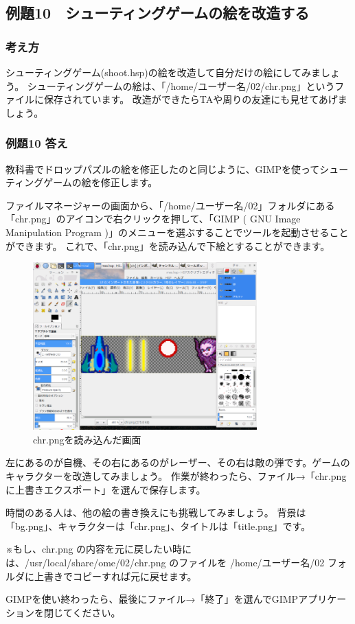 \clearpage

\subsection{例題10　シューティングゲームの絵を改造する}

\subsubsection*{考え方}

シューティングゲーム(shoot.hsp)の絵を改造して自分だけの絵にしてみましょう。
シューティングゲームの絵は、「/home/ユーザー名/02/chr.png」というファイルに保存されています。
改造ができたらTAや周りの友達にも見せてあげましょう。

\subsubsection*{例題10 答え}

教科書でドロップパズルの絵を修正したのと同じように、GIMPを使ってシューティングゲームの絵を修正します。

ファイルマネージャーの画面から、「/home/ユーザー名/02」フォルダにある「chr.png」のアイコンで右クリックを押して、「GIMP ( GNU Image Manipulation Program )」のメニューを選ぶすることでツールを起動させることができます。
これで、「chr.png」を読み込んで下絵とすることができます。

\begin{figure}[H]
    \begin{center}
        \includegraphics[keepaspectratio,width=8.625cm,height=6.459cm]{text02-img/text02-img042.png}
        \caption{chr.pngを読み込んだ画面}
    \end{center}
\end{figure}

左にあるのが自機、その右にあるのがレーザー、その右は敵の弾です。ゲームのキャラクターを改造してみましょう。
作業が終わったら、ファイル→「chr.pngに上書きエクスポート」を選んで保存します。

時間のある人は、他の絵の書き換えにも挑戦してみましょう。
背景は「bg.png」、キャラクターは「chr.png」、タイトルは「title.png」です。

※もし、chr.png の内容を元に戻したい時には、/usr/local/share/ome/02/chr.png のファイルを /home/ユーザー名/02 フォルダに上書きでコピーすれば元に戻せます。

GIMPを使い終わったら、最後にファイル→「終了」を選んでGIMPアプリケーションを閉じてください。

